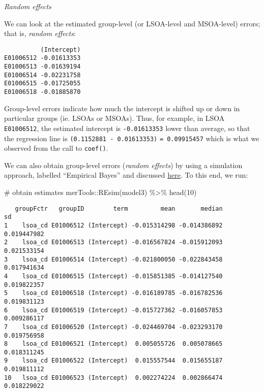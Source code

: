 \documentclass[
  letterpaper,
  krantz2]{style/krantz}
\newenvironment{Shaded}{\begin{snugshade}}{\end{snugshade}}
\newcommand{\CommentTok}[1]{\textcolor[rgb]{0.37,0.37,0.37}{#1}}
\newcommand{\DecValTok}[1]{\textcolor[rgb]{0.68,0.00,0.00}{#1}}
\newcommand{\FunctionTok}[1]{\textcolor[rgb]{0.28,0.35,0.67}{#1}}
\newcommand{\NormalTok}[1]{\textcolor[rgb]{0.00,0.23,0.31}{#1}}
\newcommand{\OtherTok}[1]{\textcolor[rgb]{0.00,0.23,0.31}{#1}}
\newcommand{\SpecialCharTok}[1]{\textcolor[rgb]{0.37,0.37,0.37}{#1}}
\begin{document}
\emph{Random effects}

We can look at the estimated group-level (or LSOA-level and MSOA-level)
errors; that is, \emph{random effects}:

\begin{Shaded}
\end{Shaded}

\begin{verbatim}
          (Intercept)
E01006512 -0.01613353
E01006513 -0.01639194
E01006514 -0.02231758
E01006515 -0.01725055
E01006518 -0.01885870
\end{verbatim}

Group-level errors indicate how much the intercept is shifted up or down
in particular groups (ie. LSOAs or MSOAs). Thus, for example, in LSOA
\texttt{E01006512}, the estimated intercept is \texttt{-0.01613353}
lower than average, so that the regression line is
\texttt{(0.1152881\ -\ 0.01613353)} \texttt{=\ 0.09915457} which is what
we observed from the call to \texttt{coef()}.

We can also obtain group-level errors (\emph{random effects}) by using a
simulation approach, labelled ``Empirical Bayes'' and discussed
\href{https://stat.ethz.ch/pipermail/r-sig-mixed-models/2009q4/002984.html}{here}.
To this end, we run:

\begin{Shaded}
\begin{Highlighting}[]
\CommentTok{\# obtain estimates}
\NormalTok{merTools}\SpecialCharTok{::}\FunctionTok{REsim}\NormalTok{(model3) }\SpecialCharTok{\%\textgreater{}\%} \FunctionTok{head}\NormalTok{(}\DecValTok{10}\NormalTok{)}
\end{Highlighting}
\end{Shaded}

\begin{verbatim}
   groupFctr   groupID        term         mean       median          sd
1    lsoa_cd E01006512 (Intercept) -0.015314298 -0.014386892 0.019447982
2    lsoa_cd E01006513 (Intercept) -0.016567824 -0.015912093 0.021533154
3    lsoa_cd E01006514 (Intercept) -0.021800050 -0.022843458 0.017941634
4    lsoa_cd E01006515 (Intercept) -0.015851385 -0.014127540 0.019822357
5    lsoa_cd E01006518 (Intercept) -0.016189785 -0.016782536 0.019831123
6    lsoa_cd E01006519 (Intercept) -0.015727362 -0.016057853 0.009286117
7    lsoa_cd E01006520 (Intercept) -0.024469704 -0.023293170 0.019756958
8    lsoa_cd E01006521 (Intercept)  0.005055726  0.005078665 0.018311245
9    lsoa_cd E01006522 (Intercept)  0.015557544  0.015655187 0.019811112
10   lsoa_cd E01006523 (Intercept)  0.002274224  0.002866474 0.018229022
\end{verbatim}
\end{document}
